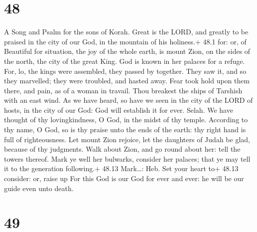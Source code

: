 \hypertarget{section-47}{%
\section{48}\label{section-47}}

A Song and Psalm for the sons of Korah.  Great is the LORD,
and greatly to be praised in the city of our God, in the mountain of his
holiness.+ 48.1 for: or, of  Beautiful for situation, the
joy of the whole earth, is mount Zion, on the sides of the north, the
city of the great King.  God is known in her palaces for a
refuge.  For, lo, the kings were assembled, they passed by
together.  They saw it, and so they marvelled; they were
troubled, and hasted away.  Fear took hold upon them there,
and pain, as of a woman in travail.  Thou breakest the ships
of Tarshish with an east wind.  As we have heard, so have we
seen in the city of the LORD of hosts, in the city of our God: God will
establish it for ever. Selah.  We have thought of thy
lovingkindness, O God, in the midst of thy temple. 
According to thy name, O God, so is thy praise unto the ends of the
earth: thy right hand is full of righteousness.  Let mount
Zion rejoice, let the daughters of Judah be glad, because of thy
judgments.  Walk about Zion, and go round about her: tell
the towers thereof.  Mark ye well her bulwarks, consider
her palaces; that ye may tell it to the generation following.+ 48.13
Mark\ldots: Heb. Set your heart to+ 48.13 consider: or, raise up
 For this God is our God for ever and ever: he will be our
guide even unto death.

\hypertarget{section-48}{%
\section{49}\label{section-48}}

